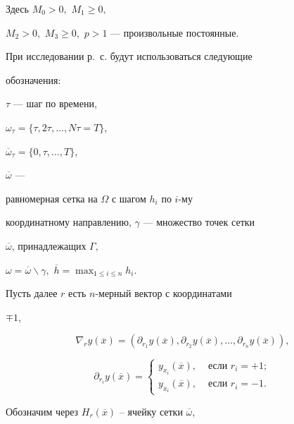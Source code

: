Здесь $ M_{0}>0,$ $M_{1}\ge 0,$


$ M_{2}>0,$ $M_{3}\ge 0,$ $p > 1 $ --- произвольные постоянные.





При исследовании р.~с. будут использоваться следующие


обозначения:


$\tau $ --- шаг по времени,


$\omega_{\tau} = \{ \tau,2\tau,\dotsc,N\tau = T \}$,


$ \overline{\omega}_{\tau} = \{ 0,\tau,\dotsc,T \} $,


$\overline{\omega}$ ---


равномерная сетка на $ \Omega $ с шагом $ h_{i}$ по $i$-му


координатному направлению, $\gamma $ --- множество точек сетки


$\overline{\omega}$, принадлежащих $\Gamma, $


$\omega = \overline{\omega}\backslash \gamma ,$ $\overline{h} =


\max_{1\le i \le n} h_{i}.$





Пусть далее $r$ есть $n$-мерный вектор с координатами


$\mp 1 $,


$$


 \nabla_{r} y( \overline{x}) = ( \partial_{r_{1}} y(\overline{x}),


\partial_{r_{2}} y(\overline{x}), \dotsc,\partial_{r_{n}} y(\overline{x}) ),


$$


%


$$


\partial_{r_{i}} y(\overline{x}) =


\begin{cases}


y_{x_{i}}(\overline{x}),           &\text{ если $r_i=+1;$}\\


y_{\overline{x}_{i}}(\overline{x}),&\text { если $r_i=-1.$}


\end{cases}


$$





Обозначим через $H_r(\overline{x})$ -- ячейку сетки $\overline{\omega}$,


